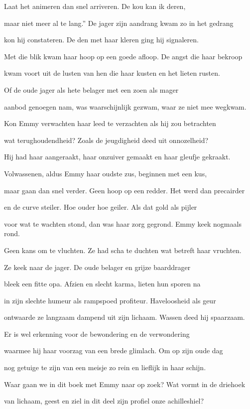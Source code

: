 Laat het animeren
dan snel arriveren.
De kou kan ik deren,

maar niet meer al te lang.”
De jager zijn aandrang
kwam zo in het gedrang

kon hij constateren.
De den met haar kleren
ging hij signaleren.

Met die blik kwam haar hoop
op een goede afloop.
De angst die haar bekroop

kwam voort uit de lusten
van hen die haar kusten
en het lieten rusten.

Of de oude jager
als hete belager
met een zoen als mager

aanbod genoegen nam,
was waarschijnlijk gezwam,
waar ze niet mee wegkwam.

Kon Emmy verwachten
haar leed te verzachten
als hij zou betrachten

wat terughoudendheid?
Zoals de jeugdigheid
deed uit onnozelheid?

Hij had haar aangeraakt,
haar onzuiver gemaakt
en haar gleufje gekraakt.

Volwassenen, aldus
Emmy haar oudste zus,
beginnen met een kus,

maar gaan dan snel verder.
Geen hoop op een redder.
Het werd dan precairder

en de curve steiler.
Hoe ouder hoe geiler.
Als dat gold als pijler

voor wat te wachten stond,
dan was haar zorg gegrond.
Emmy keek nogmaals rond.

Geen kans om te vluchten.
Ze had scha te duchten
wat betreft haar vruchten.

Ze keek naar de jager.
De oude belager
en grijze baarddrager

bleek een fitte opa.
Afzien en slecht karma,
lieten hun sporen na

in zijn slechte humeur
als rampspoed profiteur.
Haveloosheid als geur

ontwaarde ze langzaam
dampend uit zijn lichaam.
Wassen deed hij spaarzaam.

Er is wel erkenning
voor de bewondering
en de verwondering

waarmee hij haar voorzag
van een brede glimlach.
Om op zijn oude dag

nog getuige te zijn
van een meisje zo rein
en lieflijk in haar schijn.

Waar gaan we in dit boek
met Emmy naar op zoek?
Wat vormt in de driehoek

van lichaam, geest en ziel
in dit deel zijn profiel
onze achilleshiel?

